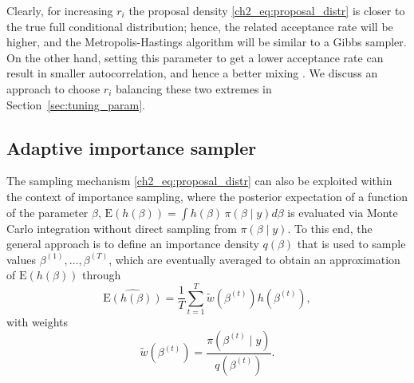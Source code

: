 %

Clearly, for increasing $r_i$ the proposal density \eqref{ch2_eq:proposal_distr} is closer to the true full conditional distribution; hence, the related acceptance rate will be higher, and the Metropolis-Hastings algorithm will be similar to a Gibbs sampler. 
On the other hand, setting this parameter to get a lower acceptance rate can result in smaller autocorrelation, and hence a better mixing \parencite{robert2010}. We discuss an approach to choose $r_i$ balancing these two extremes in Section~\ref{sec:tuning_param}.


\subsection{Adaptive importance sampler}
\label{ch2_sec:is}

The sampling mechanism \eqref{ch2_eq:proposal_distr} can also be exploited within the context of importance sampling, where the posterior expectation of a function of the parameter $\beta$, $\mathrm{E}\left( h(\beta) \right) = \int h(\beta)\, \pi(\beta \mid y) d\beta$ is evaluated via Monte Carlo integration without direct sampling from $\pi(\beta \mid y)$. To this end, the general approach is to define an importance density $q(\beta)$ that is used to sample values $\beta^{(1)}, \dots, \beta^{(T)}$, which are eventually averaged to obtain an approximation of $\mathrm{E}\left( h(\beta) \right)$ through
\[
\widehat{\mathrm{E}( h(\beta))} = \frac{1}{T} \sum_{t=1}^T \tilde{w}(\beta^{(t)}) h(\beta^{(t)}),
\]
with weights 
\begin{equation*}
\tilde{w}(\beta^{(t)}) = \frac{\pi(\beta^{(t)} \mid y)}{q(\beta^{(t)})}.
\end{equation*}

